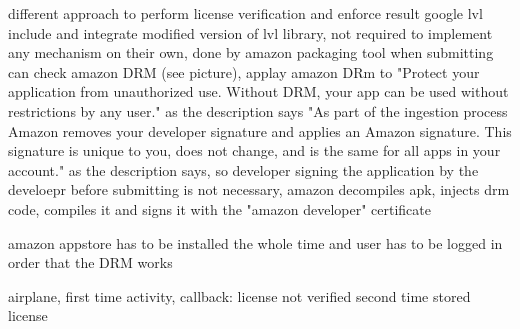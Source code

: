 %
different approach to perform license verification and enforce result
google lvl include and integrate modified version of lvl library, not required to implement any mechanism on their own, done by amazon packaging tool
when submitting can check amazon DRM (see picture), applay amazon DRm to "Protect your application from unauthorized use. Without DRM, your app can be used without restrictions by any user." as the description says
"As part of the ingestion process Amazon removes your developer signature and applies an Amazon signature. This signature is unique to you, does not change, and is the same for all apps in your account."  as the description says, so developer signing the application by the develoepr before submitting is not necessary, amazon decompiles apk, injects drm code, compiles it and signs it with the "amazon developer" certificate
\cite{munteanLicense}
%




amazon appstore has to be installed the whole time and user has to be logged in order that the DRM works

airplane, first time
activity, callback: license not verified
second time
stored license
